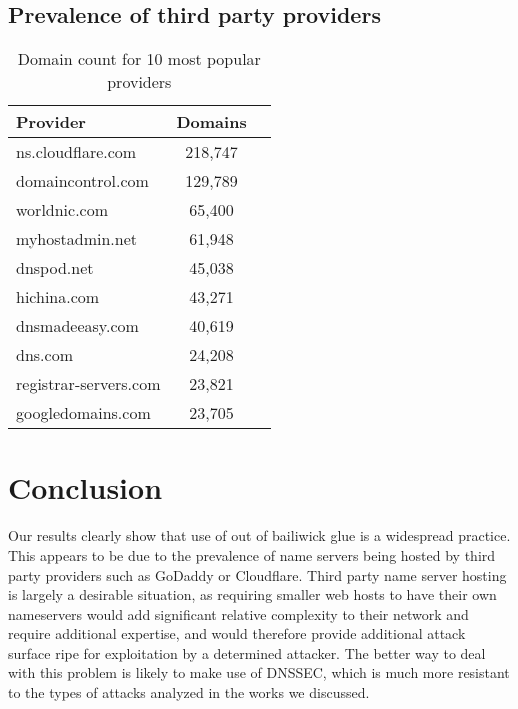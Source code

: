 \documentclass{idc_msc}
\begin{document}
\subsection{Prevalence of third party providers}

\begin{table}
\begin{tabular}{l|cc}
 Provider & Domains & \\
 \hline
 ns.cloudflare.com & 218,747 & \\
 domaincontrol.com & 129,789 & \\
 worldnic.com & 65,400 & \\
 myhostadmin.net & 61,948 & \\
 dnspod.net & 45,038 & \\
 hichina.com & 43,271 & \\
 dnsmadeeasy.com & 40,619 & \\
 dns.com & 24,208 & \\
 registrar-servers.com & 23,821 & \\
 googledomains.com & 23,705 & \\
\end{tabular}
\caption{Domain count for 10 most popular providers}
\end{table}




\section{Conclusion}
Our results clearly show that use of out of bailiwick glue is a widespread practice. This appears to be due to the prevalence of name servers being hosted by third party providers such as GoDaddy or Cloudflare. Third party name server hosting is largely a desirable situation, as requiring smaller web hosts to have their own nameservers would add significant relative complexity to their network and require additional expertise, and would therefore provide additional attack surface ripe for exploitation by a determined attacker. The better way to deal with this problem is likely to make use of DNSSEC, which is much more resistant to the types of attacks analyzed in the works we discussed.
\end{document}
